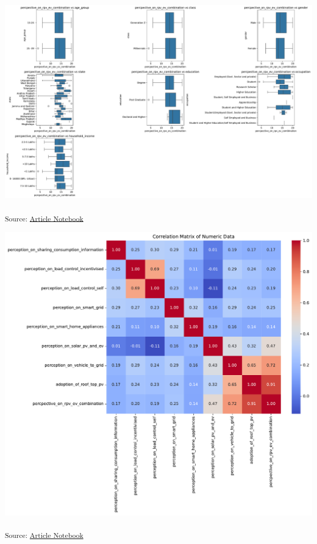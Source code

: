 \documentclass[
  letterpaper,
  DIV=11,
  numbers=noendperiod]{scrartcl}
\begin{document}
\includegraphics{index_files/figure-pdf/cell-5-output-10.pdf}

\textsubscript{Source:
\href{https://sijuswamyresearch.github.io/SM-project/index-preview.html}{Article
Notebook}}

\includegraphics{index_files/figure-pdf/cell-6-output-1.pdf}

\textsubscript{Source:
\href{https://sijuswamyresearch.github.io/SM-project/index-preview.html}{Article
Notebook}}
\end{document}
